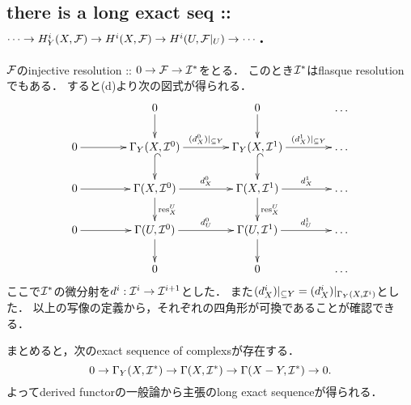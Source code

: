 \documentclass[a4paper]{jsarticle}
\begin{document}
    \subsection{there is a long exact seq ::
        $\cdots \to H_Y^i(X,\mathcal{F}) \to H^i(X, \mathcal{F}) \to H^i(U, \mathcal{F}|_U) \to \cdots$. }
    $\mathcal{F}$のinjective resolution :: $0 \to \mathcal{F} \to \mathcal{I}^*$をとる．
    このとき$\mathcal{I}^*$はflasque resolutionでもある．
    すると(d)より次の図式が得られる．
    \[
    \xymatrix@R=20pt@C=40pt
    {
        {} & 0 \ar[d]& 0 \ar[d]& \dots \\
        0 \ar[r]& \Gamma_Y(X, \shI^0) \ar[r]^-{(d^0_{X})|_{\subseteq Y}}\ar@{^(->}[d]&
                  \Gamma_Y(X, \shI^1) \ar[r]^-{(d^1_{X})|_{\subseteq Y}}\ar@{^(->}[d]& \dots \\
        0 \ar[r]& \Gamma(X, \shI^0)   \ar[r]^-{d^0_X}\ar[d]^-{\res_X^U}&
                  \Gamma(X, \shI^1)   \ar[r]^-{d^1_X}\ar[d]^-{\res_X^U}& \dots \\
        0 \ar[r]& \Gamma(U, \shI^0)   \ar[r]^-{d^0_U}\ar[d]&
                  \Gamma(U, \shI^1)   \ar[r]^-{d^1_U}\ar[d]& \dots \\
        {} & 0 & 0 & \dots \\
    }
    \]
    ここで$\mathcal{I}^*$の微分射を$d^i: \mathcal{I}^i \to \mathcal{I}^{i+1}$とした．
    また$(d^i_{X})|_{\subseteq Y}=(d^i_{X})|_{\Gamma_Y(X, \mathcal{I}^i)}$とした．
    以上の写像の定義から，それぞれの四角形が可換であることが確認できる．

    まとめると，次のexact sequence of complexsが存在する．
    \[ 0 \to \Gamma_Y(X, \mathcal{I}^*) \to \Gamma(X, \mathcal{I}^*) \to \Gamma(X-Y, \mathcal{I}^*) \to 0. \]
    よってderived functorの一般論から主張のlong exact sequenceが得られる．
\end{document}
